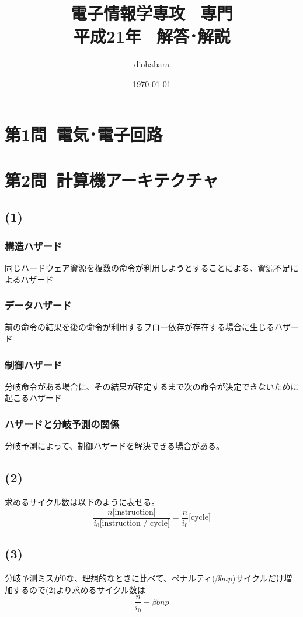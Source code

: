 \documentclass[a4paper,12pt,xelatex,ja=standard]{bxjsarticle}
\title{電子情報学専攻 \, 専門 \\ 平成21年 \, 解答･解説}
\author{diohabara}
\date{\today}
\begin{document}
\maketitle

\section*{第1問\ 電気･電子回路}

\section*{第2問\ 計算機アーキテクチャ}
\subsection*{(1)}
\subsubsection*{構造ハザード}
同じハードウェア資源を複数の命令が利用しようとすることによる、資源不足によるハザード

\subsubsection*{データハザード}
前の命令の結果を後の命令が利用するフロー依存が存在する場合に生じるハザード

\subsubsection*{制御ハザード}
分岐命令がある場合に、その結果が確定するまで次の命令が決定できないために起こるハザード

\subsubsection*{ハザードと分岐予測の関係}
分岐予測によって、制御ハザードを解決できる場合がある。

\subsection*{(2)}
求めるサイクル数は以下のように表せる。
\[
  \frac{n \text{[instruction]}}{i_0 \text{[instruction / cycle]}} = \frac{n}{i_0}\text{[cycle]}
\]

\subsection*{(3)}
分岐予測ミスが0な、理想的なときに比べて、ペナルティ($\beta bnp$)サイクルだけ増加するので(2)より求めるサイクル数は
\[
  \frac{n}{i_0} + \beta b n p
\]
\end{document}
